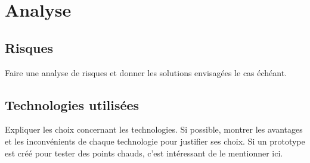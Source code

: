 
\clearpage
{} %

\chapter{Analyse}
\section{Risques}
Faire une analyse de risques et donner les solutions envisagées le cas échéant.

\section{Technologies utilisées}
Expliquer les choix concernant les technologies.
Si possible, montrer les avantages et les inconvénients de chaque technologie pour justifier ses choix.
Si un prototype est créé pour tester des points chauds, c'est intéressant de le mentionner ici.